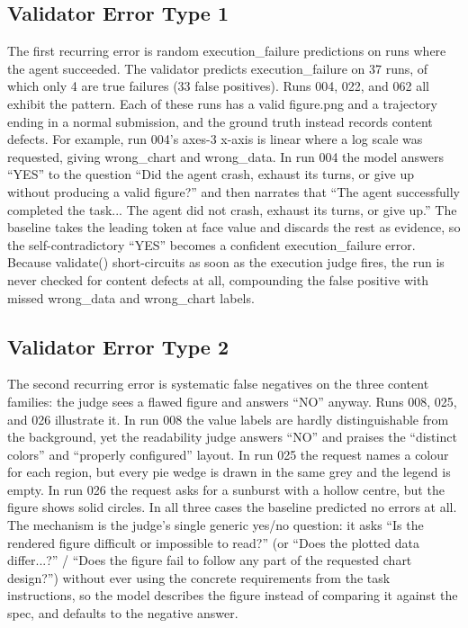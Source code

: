\documentclass[11pt]{article}
\begin{document}
\subsection{Validator Error Type 1}
The first recurring error is random execution_failure predictions on runs where the agent succeeded. The validator predicts execution_failure on 37 runs, of which only 4 are true failures (33 false positives). Runs 004, 022, and 062 all exhibit the pattern. Each of these runs has a valid figure.png and a trajectory ending in a normal submission, and the ground truth instead records content defects. For example, run 004's axes-3 x-axis is linear where a log scale was requested, giving wrong_chart and wrong_data. In run 004 the model answers ``YES'' to the question ``Did the agent crash, exhaust its turns, or give up without producing a valid figure?'' and then narrates that ``The agent successfully completed the task... The agent did not crash, exhaust its turns, or give up.'' The baseline takes the leading token at face value and discards the rest as evidence, so the self-contradictory ``YES'' becomes a confident execution_failure error. Because validate() short-circuits as soon as the execution judge fires, the run is never checked for content defects at all, compounding the false positive with missed wrong_data and wrong_chart labels.

\subsection{Validator Error Type 2}
The second recurring error is systematic false negatives on the three content families: the judge sees a flawed figure and answers ``NO'' anyway. Runs 008, 025, and 026 illustrate it. In run 008 the value labels are hardly distinguishable from the background, yet the readability judge answers ``NO'' and praises the ``distinct colors'' and ``properly configured'' layout. In run 025 the request names a colour for each region, but every pie wedge is drawn in the same grey and the legend is empty. In run 026 the request asks for a sunburst with a hollow centre, but the figure shows solid circles. In all three cases the baseline predicted no errors at all. The mechanism is the judge's single generic yes/no question: it asks ``Is the rendered figure difficult or impossible to read?'' (or ``Does the plotted data differ...?'' / ``Does the figure fail to follow any part of the requested chart design?'') without ever using the concrete requirements from the task instructions, so the model describes the figure instead of comparing it against the spec, and defaults to the negative answer.
\end{document}
